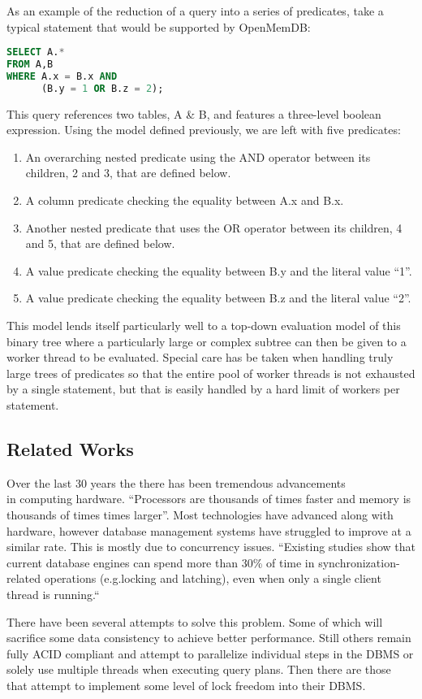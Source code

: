 \documentclass[letterpaper, 11pt]{article}
\begin{document}
\par\vspace{\baselineskip}
As an example of the reduction of a query into a series of predicates, take a
typical statement that would be supported by OpenMemDB:
\begin{lstlisting}[language=SQL]
SELECT A.*
FROM A,B
WHERE A.x = B.x AND
      (B.y = 1 OR B.z = 2);
\end{lstlisting}
This query references two tables, A \& B, and features a three-level boolean expression.
Using the model defined previously, we are left with five predicates:
\begin{enumerate}
 \item An overarching nested predicate using the AND operator between its children, 2 and 3, that are defined below.
 \item A column predicate checking the equality between A.x and B.x.
 \item Another nested predicate that uses the OR operator between its children, 4 and 5, that are defined below.
 \item A value predicate checking the equality between B.y and the literal value ``1''.
 \item A value predicate checking the equality between B.z and the literal value ``2''.
\end{enumerate}
This model lends itself particularly well to a top-down evaluation model of this binary tree
where a particularly large or complex subtree can then be given to a worker thread to be evaluated.
Special care has be taken when handling truly large trees of predicates so that the entire
pool of worker threads is not exhausted by a single statement, but that is easily handled
by a hard limit of workers per statement.


\subsection{Related Works}
Over the last 30 years the there has been tremendous advancements \\ in computing
hardware. ``Processors are thousands of times faster and memory is thousands of
times times larger''\cite{stonebraker2007end}. Most technologies have advanced
along with hardware, however database management systems have struggled to improve
at a similar rate. This is mostly due to concurrency issues. ``Existing studies show
that current database engines can spend more than 30\% of time in
synchronization-related operations (e.g.locking and latching), even when only a
single client thread is running.`` \cite{soares2015database}
\par\vspace{\baselineskip}
There have been several attempts to solve this problem. Some of which will sacrifice
some data consistency to achieve better performance. Still others
remain fully ACID compliant and attempt to parallelize individual steps in the
DBMS or solely use multiple threads when executing query plans. Then there are those
that attempt to implement some level of lock freedom into their DBMS.
\par\vspace{\baselineskip}
\end{document}
